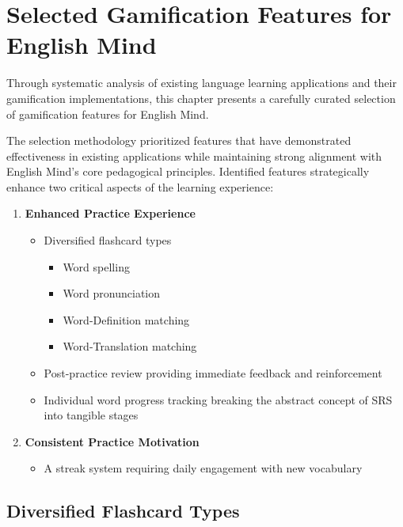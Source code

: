 \chapter{Selected Gamification Features for English Mind}

Through systematic analysis of existing language learning applications and their gamification implementations, this chapter presents a carefully curated selection of gamification features for English Mind. 

The selection methodology prioritized features that have demonstrated effectiveness in existing applications while maintaining strong alignment with English Mind's core pedagogical principles. Identified features strategically enhance two critical aspects of the learning experience:

\begin{enumerate}
    \item \textbf{Enhanced Practice Experience} 
    \begin{itemize}
        \item Diversified flashcard types
        \begin{itemize}
            \item Word spelling
            \item Word pronunciation
            \item Word-Definition matching
            \item Word-Translation matching
        \end{itemize}
        \item Post-practice review providing immediate feedback and reinforcement
        \item Individual word progress tracking breaking the abstract concept of SRS into tangible stages
    \end{itemize}
    
    \item \textbf{Consistent Practice Motivation} 
    \begin{itemize}
        \item A streak system requiring daily engagement with new vocabulary
    \end{itemize}
\end{enumerate}

\newpage
\section{Diversified Flashcard Types}

